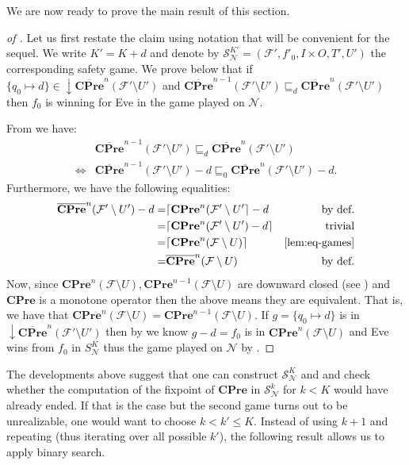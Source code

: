 \documentclass[runningheads,a4paper,draft]{llncs}
\newcommand{\cpre}{\mathbf{CPre}}
\newcommand{\calF}{\mathcal{F}}
\newcommand{\calN}{\mathcal{N}}
\newcommand{\calS}{\mathcal{S}}
\newcommand{\closedn}[1]{\mathrm{\downarrow} #1}
\begin{document}
We are now ready to prove the main result of this section.
\begin{proof}[of ]
  Let us first restate the claim using notation that will be convenient for
  the sequel. We write $K' = K + d$ and denote by $\calS_\calN^{K'} =
  (\calF',f'_0,I \times O, T',U')$ the corresponding safety game. We prove
  below that if $\{q_0 \mapsto d\} \in \closedn{\overline{\cpre}^n(\calF'
  \setminus U')}$ and $\overline{\cpre}^{n-1}(\calF'\setminus U') \sqsubseteq_d
  \overline{\cpre}^n(\calF' \setminus U')$ then $f_0$ is winning for Eve in
  the game played on $\calN$.

  From   we have:
  \begin{align*}
    &\overline{\cpre}^{n-1}(\calF' \setminus U') \sqsubseteq_d
    \overline{\cpre}^n(\calF' \setminus U')\\
    \iff & \overline{\cpre}^{n-1}(\calF' \setminus U') - d \sqsubseteq_0
    \overline{\cpre}^n(\calF' \setminus U') - d.
  \end{align*}
  Furthermore, we have the following equalities:
  \begin{align*}
    \overline{\cpre}^n(\calF' \setminus U') - d = & \lceil \cpre^n(\calF' \setminus
    U'\rceil -d & \text{by def.}\\
    = & \lceil \cpre^n(\calF' \setminus U') -d \rceil & \text{trivial}\\
    = & \lceil \cpre^n(\calF \setminus U) \rceil & \text{\Cref{lem:eq-games}}\\
    = & \overline{\cpre}^n(\calF \setminus U) & \text{by def.}
  \end{align*}
  Now, since $\cpre^n(\calF \setminus U), \cpre^{n-1}(\calF \setminus U)$ are downward
  closed (see ) and $\cpre$ is a monotone operator then
  the above means they are equivalent. That is, we have that $\cpre^n(\calF
  \setminus U) = \cpre^{n-1}(\calF \setminus U)$. If $g = \{q_0 \mapsto d\}$ is in
  $\closedn{ \overline{\cpre}^n(\calF' \setminus U') }$ then by
   we know $g - d = f_0$ is in $\cpre^n(\calF \setminus U)$ and
  Eve wins from $f_0$ in $S^K_\calN$ thus the game played on $\calN$
  by .
\end{proof}

The developments above suggest that one can construct $\calS^K_\calN$ and and
check whether the computation of the fixpoint of $\cpre$ in $\calS^{k}_\calN$
for $k < K$ would have already ended. If that is the case but the second game
turns out to be unrealizable, one would want to choose $k < k' \leq K$.
Instead of using $k + 1$ and repeating (thus iterating over all possible
$k'$), the following result allows us to apply binary search.
\end{document}
